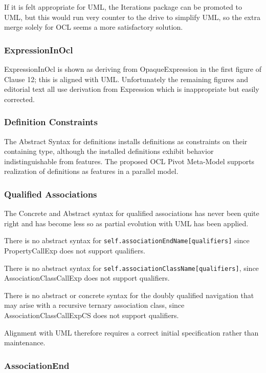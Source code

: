 \documentclass{eceasst}
\begin{document}
If it is felt appropriate for UML, the Iterations package can be promoted to UML, but this would run very counter to the drive to simplify UML, so the extra merge solely for OCL seems a more satisfactory solution. 

\subsubsection{ExpressionInOcl}

ExpressionInOcl is shown as deriving from OpaqueExpression in the first figure of Clause 12; this is aligned with UML. Unfortunately the remaining figures and editorial text all use derivation from Expression which is inappropriate but easily corrected.

\subsubsection{Definition Constraints}

The Abstract Syntax for definitions installs definitions as constraints on their containing type, although the installed definitions exhibit behavior indistinguishable from features. The proposed OCL Pivot Meta-Model supports realization of definitions as features in a parallel model.

\subsubsection{Qualified Associations}

The Concrete and Abstract syntax for qualified associations has never been quite right and has become less so as partial evolution with UML has been applied.

There is no abstract syntax for \verb|self.associationEndName[qualifiers]| since PropertyCallExp does not support qualifiers.

There is no abstract syntax for \verb|self.associationClassName[qualifiers]|, since AssociationClassCallExp does not support qualifiers.

There is no abstract or concrete syntax for the doubly qualified navigation that may arise with a recursive ternary association class, since AssociationClassCallExpCS does not support qualifiers.

Alignment with UML therefore requires a correct initial specification rather than maintenance. 

\subsubsection{AssociationEnd}
\end{document}
